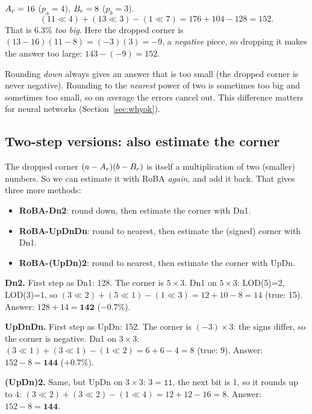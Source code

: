 \begin{example}
$A_r = 16$ ($p_a=4$), $B_r = 8$ ($p_b=3$).
\[
  (11\ll 4) + (13\ll 3) - (1\ll 7) = 176 + 104 - 128 = 152.
\]
That is 6.3\% \emph{too big}. Here the dropped corner is $(13-16)(11-8) = (-3)(3) = -9$, a
\emph{negative} piece, so dropping it makes the answer too large: $143-(-9) = 152$.
\end{example}

\begin{keyidea}
Rounding \emph{down} always gives an answer that is too small (the dropped corner is never
negative). Rounding to the \emph{nearest} power of two is sometimes too big and sometimes too small,
so on average the errors cancel out. This difference matters for neural networks
(Section~\ref{sec:whyok}).
\end{keyidea}

\subsection{Two-step versions: also estimate the corner}

The dropped corner $(a-A_r)(b-B_r)$ is itself a multiplication of two (smaller) numbers. So we can
estimate it with RoBA \emph{again}, and add it back. That gives three more methods:

\begin{itemize}
  \item \textbf{RoBA-Dn2}: round down, then estimate the corner with Dn1.
  \item \textbf{RoBA-UpDnDn}: round to nearest, then estimate the (signed) corner with Dn1.
  \item \textbf{RoBA-(UpDn)2}: round to nearest, then estimate the corner with UpDn.
\end{itemize}

\begin{example}
\textbf{Dn2.} First step as Dn1: 128. The corner is $5\times 3$. Dn1 on $5\times 3$:
LOD(5)=2, LOD(3)=1, so $(3\ll 2) + (5\ll 1) - (1\ll 3) = 12+10-8 = 14$ (true: 15).
Answer: $128 + 14 = \mathbf{142}$ ($-0.7\%$).

\textbf{UpDnDn.} First step as UpDn: 152. The corner is $(-3)\times 3$: the signs differ, so the
corner is negative. Dn1 on $3\times 3$: $(3\ll1)+(3\ll1)-(1\ll2) = 6+6-4 = 8$ (true: 9).
Answer: $152 - 8 = \mathbf{144}$ ($+0.7\%$).

\textbf{(UpDn)2.} Same, but UpDn on $3\times 3$: $3=\texttt{11}$, the next bit is 1, so it rounds up
to 4: $(3\ll2)+(3\ll2)-(1\ll4) = 12+12-16 = 8$. Answer: $152-8 = \mathbf{144}$.
\end{example}

